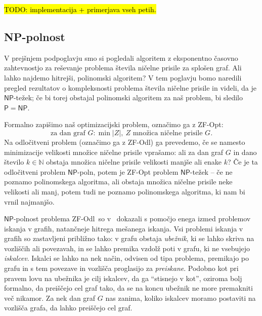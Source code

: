 \documentclass[12pt,a4paper,twoside]{article}
\theoremstyle{definition} %
\theoremstyle{plain} %
\numberwithin{equation}{section}  %
\newcommand{\N}{\mathbb N}
\renewcommand{\P}{\ensuremath{\mathsf{P}}}
\newcommand{\NP}{\ensuremath{\mathsf{NP}}}
\newcommand{\ZFOdl}{\textsf{ZF-Odl}}
\begin{document}
\hl{TODO: implementacija + primerjava vseh petih.}

\subsection{NP-polnost}
\label{subsec:np-polnost}

V prejšnjem podpoglavju smo si pogledali algoritem z eksponentno časovno zahtevnostjo za reševanje problema števila ničelne prisile za splošen graf. Ali lahko najdemo hitrejši, polinomski algoritem? V tem poglavju bomo naredili pregled rezultatov o kompleksnosti problema števila ničelne prisile in videli, da je $\NP$-težek; če bi torej obstajal polinomski algoritem za naš problem, bi sledilo $\P = \NP$. 

Formalno zapišimo naš optimizacijski problem, označimo ga z \textsf{ZF-Opt}:
\[ \text{za dan graf } G\colon \min |Z|,\ Z \text{ množica ničelne prisile } G .\]
Na odločitveni problem (označimo ga z \ZFOdl) ga prevedemo, če se namesto minimizacije velikosti množice ničelne prisile vprašamo: ali za dan graf $G$ in dano število $k \in \N$ obstaja množica ničelne prisile velikosti manjše ali enake $k$? Če je ta odločitveni problem $\NP$-poln, potem je \textsf{ZF-Opt} problem $\NP$-težek -- če ne poznamo polinomskega algoritma, ali obstaja množica ničelne prisile neke velikosti ali manj, potem tudi ne poznamo polinomskega algoritma, ki nam bi vrnil najmanjšo. 

$\NP$-polnost problema \ZFOdl\ so v~\cite{fallat2016complexity} dokazali s pomočjo enega izmed problemov iskanja v grafih, natančneje hitrega mešanega iskanja. Vsi problemi iskanja v grafih so zastavljeni približno tako: v grafu obstaja \emph{ubežnik}, ki se lahko skriva na vozliščih ali povezavah, in se lahko premika vzdolž poti v grafu, ki ne vsebujejo \emph{iskalcev}. Iskalci se lahko na nek način, odvisen od tipa problema, premikajo po grafu in s tem povezave in vozlišča proglasijo za \emph{preiskane}. Podobno kot pri pravem lovu na ubežnika je cilj iskalcev, da ga ``stisnejo v kot'', oziroma bolj formalno, da preiščejo cel graf tako, da se na koncu ubežnik ne more premakniti več nikamor. Za nek dan graf $G$ nas zanima, koliko iskalcev moramo postaviti na vozlišča grafa, da lahko preiščejo cel graf. 
\end{document}
